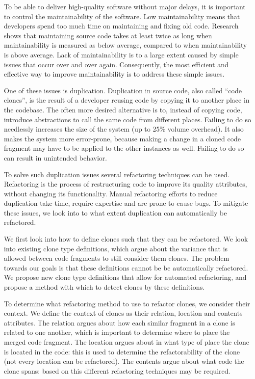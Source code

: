 To be able to deliver high-quality software without major delays, it is important to control the maintainability of the software. Low maintainability means that developers spend too much time on maintaining and fixing old code. Research shows that maintaining source code takes at least twice as long when maintainability is measured as below average, compared to when maintainability is above average. Lack of maintainability is to a large extent caused by simple issues that occur over and over again. Consequently, the most efficient and effective way to improve maintainability is to address these simple issues.

One of these issues is duplication. Duplication in source code, also called ``code clones'', is the result of a developer reusing code by copying it to another place in the codebase. The often more desired alternative is to, instead of copying code, introduce abstractions to call the same code from different places. Failing to do so needlessly increases the size of the system (up to 25\% volume overhead). It also makes the system more error-prone, because making a change in a cloned code fragment may have to be applied to the other instances as well. Failing to do so can result in unintended behavior.

To solve such duplication issues several refactoring techniques can be used. Refactoring is the process of restructuring code to improve its quality attributes, without changing its functionality. Manual refactoring efforts to reduce duplication take time, require expertise and are prone to cause bugs. To mitigate these issues, we look into to what extent duplication can automatically be refactored.

We first look into how to define clones such that they can be refactored. We look into existing clone type definitions, which argue about the variance that is allowed between code fragments to still consider them clones. The problem towards our goals is that these definitions cannot be be automatically refactored. We propose new clone type definitions that allow for automated refactoring, and propose a method with which to detect clones by these definitions.

To determine what refactoring method to use to refactor clones, we consider their context. We define the context of clones as their relation, location and contents attributes. The relation argues about how each similar fragment in a clone is related to one another, which is important to determine where to place the merged code fragment. The location argues about in what type of place the clone is located in the code: this is used to determine the refactorability of the clone (not every location can be refactored). The contents argue about what code the clone spans: based on this different refactoring techniques may be required.


